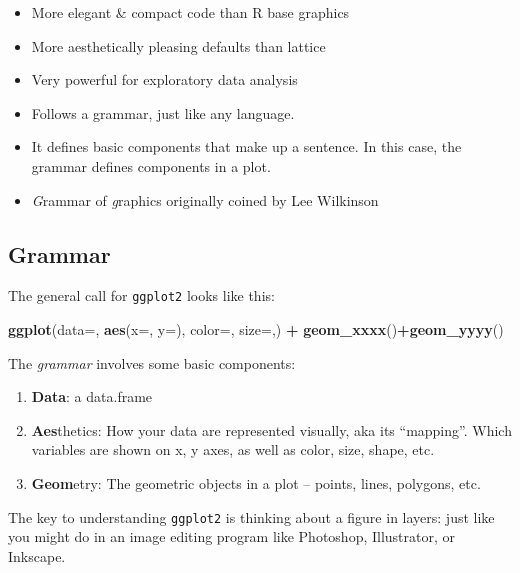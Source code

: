 \documentclass[]{book}
\newenvironment{Shaded}{\begin{snugshade}}{\end{snugshade}}
\newcommand{\DataTypeTok}[1]{\textcolor[rgb]{0.13,0.29,0.53}{#1}}
\newcommand{\KeywordTok}[1]{\textcolor[rgb]{0.13,0.29,0.53}{\textbf{#1}}}
\newcommand{\NormalTok}[1]{#1}
\newcommand{\OperatorTok}[1]{\textcolor[rgb]{0.81,0.36,0.00}{\textbf{#1}}}
\newcommand{\StringTok}[1]{\textcolor[rgb]{0.31,0.60,0.02}{#1}}
\providecommand{\tightlist}{%
  \setlength{\itemsep}{0pt}\setlength{\parskip}{0pt}}
\begin{document}
\begin{itemize}
\tightlist
\item
  More elegant \& compact code than R base graphics
\item
  More aesthetically pleasing defaults than lattice
\item
  Very powerful for exploratory data analysis
\item
  Follows a grammar, just like any language.
\item
  It defines basic components that make up a sentence. In this case, the grammar defines components in a plot.
\item
  \emph{G}rammar of \emph{g}raphics originally coined by Lee Wilkinson
\end{itemize}

\hypertarget{grammar}{%
\subsection{Grammar}\label{grammar}}

The general call for \texttt{ggplot2} looks like this:

\begin{Shaded}
\begin{Highlighting}[]
\KeywordTok{ggplot}\NormalTok{(}\DataTypeTok{data=}\NormalTok{, }\KeywordTok{aes}\NormalTok{(}\DataTypeTok{x=}\NormalTok{, }\DataTypeTok{y=}\NormalTok{), }\DataTypeTok{color=}\NormalTok{, }\DataTypeTok{size=}\NormalTok{,) }\OperatorTok{+}\StringTok{ }\KeywordTok{geom_xxxx}\NormalTok{()}\OperatorTok{+}\KeywordTok{geom_yyyy}\NormalTok{()}
\end{Highlighting}
\end{Shaded}

The \emph{grammar} involves some basic components:

\begin{enumerate}
\def\labelenumi{\arabic{enumi}.}
\tightlist
\item
  \textbf{Data}: a data.frame
\item
  \textbf{Aes}thetics: How your data are represented visually, aka its ``mapping''. Which variables are shown on x, y axes, as well as color, size, shape, etc.
\item
  \textbf{Geom}etry: The geometric objects in a plot -- points, lines, polygons, etc.
\end{enumerate}

The key to understanding \texttt{ggplot2} is thinking about a figure in layers: just like you might do in an image editing program like Photoshop, Illustrator, or Inkscape.
\end{document}
